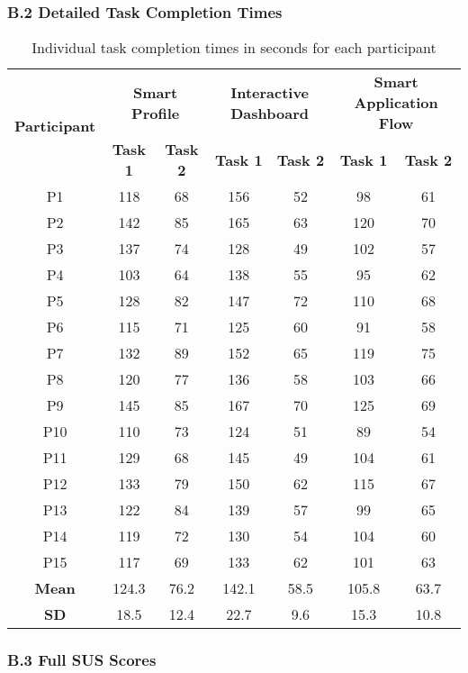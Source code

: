 \documentclass[
	letterpaper, %
]{jdf}
\begin{document}
\subsubsection{B.2 Detailed Task Completion Times}

\begin{table}[h]
\centering
\begin{tabular}{|c|c|c|c|c|c|c|}
\hline
\multirow{2}{*}{\textbf{Participant}} & \multicolumn{2}{c|}{\textbf{Smart Profile}} & \multicolumn{2}{c|}{\textbf{Interactive Dashboard}} & \multicolumn{2}{c|}{\textbf{Smart Application Flow}} \\
\cline{2-7}
 & \textbf{Task 1} & \textbf{Task 2} & \textbf{Task 1} & \textbf{Task 2} & \textbf{Task 1} & \textbf{Task 2} \\
\hline
P1 & 118 & 68 & 156 & 52 & 98 & 61 \\
\hline
P2 & 142 & 85 & 165 & 63 & 120 & 70 \\
\hline
P3 & 137 & 74 & 128 & 49 & 102 & 57 \\
\hline
P4 & 103 & 64 & 138 & 55 & 95 & 62 \\
\hline
P5 & 128 & 82 & 147 & 72 & 110 & 68 \\
\hline
P6 & 115 & 71 & 125 & 60 & 91 & 58 \\
\hline
P7 & 132 & 89 & 152 & 65 & 119 & 75 \\
\hline
P8 & 120 & 77 & 136 & 58 & 103 & 66 \\
\hline
P9 & 145 & 85 & 167 & 70 & 125 & 69 \\
\hline
P10 & 110 & 73 & 124 & 51 & 89 & 54 \\
\hline
P11 & 129 & 68 & 145 & 49 & 104 & 61 \\
\hline
P12 & 133 & 79 & 150 & 62 & 115 & 67 \\
\hline
P13 & 122 & 84 & 139 & 57 & 99 & 65 \\
\hline
P14 & 119 & 72 & 130 & 54 & 104 & 60 \\
\hline
P15 & 117 & 69 & 133 & 62 & 101 & 63 \\
\hline
\textbf{Mean} & 124.3 & 76.2 & 142.1 & 58.5 & 105.8 & 63.7 \\
\hline
\textbf{SD} & 18.5 & 12.4 & 22.7 & 9.6 & 15.3 & 10.8 \\
\hline
\end{tabular}
\caption{Individual task completion times in seconds for each participant}
\end{table}

\subsubsection{B.3 Full SUS Scores}
\end{document}
